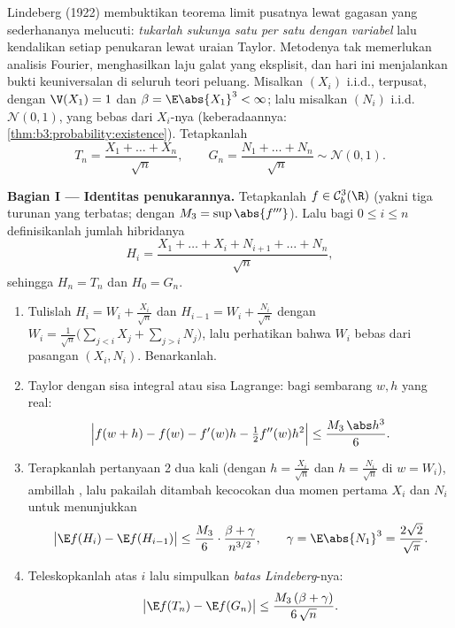 \begin{problem}
\label{pb:b3:clt:1}
Lindeberg (1922) membuktikan teorema limit pusatnya lewat gagasan
yang sederhananya melucuti: \emph{tukarlah sukunya satu per satu
dengan variabel } lalu kendalikan setiap penukaran lewat uraian
Taylor. Metodenya tak memerlukan analisis Fourier, menghasilkan
laju galat yang eksplisit, dan hari ini menjalankan bukti keuniversalan
di seluruh teori peluang. Misalkan $(X_i)$ i.i.d., terpusat, dengan
$\V(X_1) = 1$ dan $\beta = \E\abs{X_1}^3 < \infty$; lalu misalkan
$(N_i)$ i.i.d.\ $\mathcal N(0,1)$, yang bebas dari
$X_i$-nya (keberadaannya: \cref{thm:b3:probability:existence}). Tetapkanlah
\[
T_n = \frac{X_1 + \dots + X_n}{\sqrt n},
\qquad
G_n = \frac{N_1 + \dots + N_n}{\sqrt n} \sim \mathcal N(0,1).
\]

\medskip
\noindent\textbf{Bagian I --- Identitas penukarannya.} Tetapkanlah $f
\in \mathcal C^3_b(\R)$ (yakni tiga turunan  yang
terbatas; dengan $M_3 = \sup\abs{f'''}$). Lalu bagi $0 \leq i \leq n$
definisikanlah jumlah hibridanya
\[
H_i = \frac{X_1 + \dots + X_i + N_{i+1} + \dots +
N_n}{\sqrt n},
\]
sehingga $H_n = T_n$ dan $H_0 = G_n$.
\begin{enumerate}
  \item Tulislah $H_i = W_i + \frac{X_i}{\sqrt n}$ dan $H_{i-1}
        = W_i + \frac{N_i}{\sqrt n}$ dengan $W_i =
        \frac{1}{\sqrt n}\bigl(\sum_{j<i}X_j +
        \sum_{j>i}N_j\bigr)$, lalu perhatikan bahwa $W_i$
        bebas dari pasangan $(X_i, N_i)$. Benarkanlah.
  \item Taylor dengan sisa integral atau sisa Lagrange: bagi sembarang
        $w, h$ yang real:
        \[
        \Bigl|f(w + h) - f(w) - f'(w)h -
        \tfrac12f''(w)h^2\Bigr| \leq
        \frac{M_3\,\abs h^3}{6} .
        \]
  \item Terapkanlah pertanyaan 2 dua kali (dengan $h = \frac{X_i}{\sqrt n}$ dan
        $h = \frac{N_i}{\sqrt n}$ di $w = W_i$), ambillah
        , lalu pakailah  ditambah kecocokan
        dua momen pertama $X_i$ dan $N_i$ untuk menunjukkan
        \[
        \bigl|\E f(H_i) - \E f(H_{i-1})\bigr|
        \leq \frac{M_3}{6}\cdot
        \frac{\beta + \gamma}{n^{3/2}},
        \qquad \gamma = \E\abs{N_1}^3 =
        \frac{2\sqrt2}{\sqrt\pi} .
        \]
  \item Teleskopkanlah atas $i$ lalu simpulkan \emph{batas
        Lindeberg}-nya:
        \[
        \bigl|\E f(T_n) - \E f(G_n)\bigr| \leq
        \frac{M_3\,(\beta + \gamma)}{6\,\sqrt n} .
        \]
\end{enumerate}


\end{problem}
